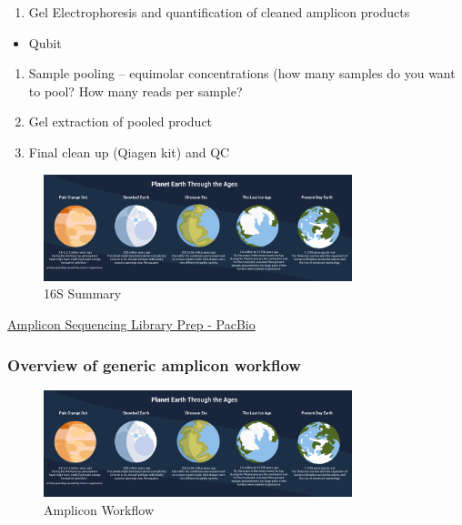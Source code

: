 \documentclass[
]{book}
\providecommand{\tightlist}{%
  \setlength{\itemsep}{0pt}\setlength{\parskip}{0pt}}
\begin{document}
\begin{enumerate}
\def\labelenumi{\arabic{enumi}.}
\tightlist
\item
  Gel Electrophoresis and quantification of cleaned amplicon products
\end{enumerate}

\begin{itemize}
\tightlist
\item
  Qubit
\end{itemize}

\begin{enumerate}
\def\labelenumi{\arabic{enumi}.}
\setcounter{enumi}{1}
\tightlist
\item
  Sample pooling -- equimolar concentrations (how many samples do you want to pool? How many reads per sample?
\item
  Gel extraction of pooled product
\item
  Final clean up (Qiagen kit) and QC
\end{enumerate}

\begin{figure}
\centering
\includegraphics[width=0.8\textwidth,height=\textheight]{./Figures/Planets.png}
\caption{16S Summary}
\end{figure}

\href{https://www.pacb.com/wp-content/uploads/Multiplexed-Amplicon-Library-Preparation-Using-SMRTbell-Express-Template-Prep-Kit-2.0-–-Customer-Training.pdf}{Amplicon Sequencing Library Prep - PacBio}

\hypertarget{overview-of-generic-amplicon-workflow}{%
\subsubsection{Overview of generic amplicon workflow}\label{overview-of-generic-amplicon-workflow}}

\begin{figure}
\centering
\includegraphics[width=0.8\textwidth,height=\textheight]{./Figures/Planets.png}
\caption{Amplicon Workflow}
\end{figure}
\end{document}
